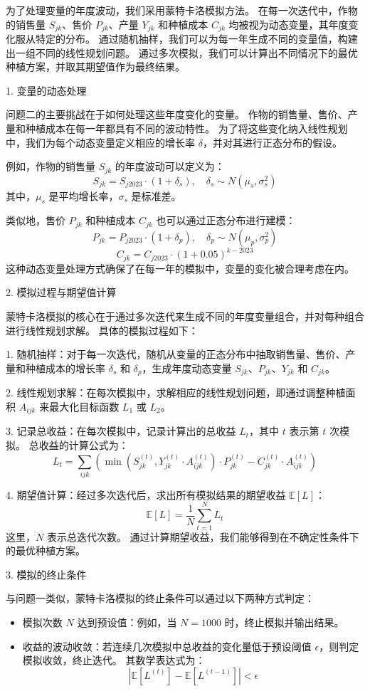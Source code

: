 \documentclass[12pt,a4paper]{nmmcm}
\begin{document}
为了处理变量的年度波动，我们采用蒙特卡洛模拟方法。
在每一次迭代中，作物的销售量 $S_{jk}$、售价 $P_{jk}$、产量 $Y_{jk}$ 和种植成本 $C_{jk}$ 均被视为动态变量，其年度变化服从特定的分布。
通过随机抽样，我们可以为每一年生成不同的变量值，构建出一组不同的线性规划问题。
通过多次模拟，我们可以计算出不同情况下的最优种植方案，并取其期望值作为最终结果。


1. 变量的动态处理

问题二的主要挑战在于如何处理这些年度变化的变量。
作物的销售量、售价、产量和种植成本在每一年都具有不同的波动特性。
为了将这些变化纳入线性规划中，我们为每个动态变量定义相应的增长率 $\delta$，并对其进行正态分布的假设。


例如，作物的销售量 $S_{jk}$ 的年度波动可以定义为：
\[
  S_{jk} = S_{j2023} \cdot (1 + \delta_s), \quad \delta_s \sim N(\mu_s, \sigma_s^2)
\]
其中，$\mu_s$ 是平均增长率，$\sigma_s$ 是标准差。


类似地，售价 $P_{jk}$ 和种植成本 $C_{jk}$ 也可以通过正态分布进行建模：
\[
  P_{jk} = P_{j2023} \cdot (1 + \delta_p), \quad \delta_p \sim N(\mu_p, \sigma_p^2)
\]
\[
  C_{jk} = C_{j2023} \cdot (1 + 0.05)^{k-2023}
\]
这种动态变量处理方式确保了在每一年的模拟中，变量的变化被合理考虑在内。


2. 模拟过程与期望值计算

蒙特卡洛模拟的核心在于通过多次迭代来生成不同的年度变量组合，并对每种组合进行线性规划求解。
具体的模拟过程如下：

1. 随机抽样：对于每一次迭代，随机从变量的正态分布中抽取销售量、售价、产量和种植成本的增长率 $\delta_s$ 和 $\delta_p$，生成年度动态变量 $S_{jk}$、$P_{jk}$、$Y_{jk}$ 和 $C_{jk}$。


2. 线性规划求解：在每次模拟中，求解相应的线性规划问题，即通过调整种植面积 $A_{ijk}$ 来最大化目标函数 $L_1$ 或 $L_2$。


3. 记录总收益：在每次模拟中，记录计算出的总收益 $L_t$，其中 $t$ 表示第 $t$ 次模拟。
总收益的计算公式为：
\[
  L_t = \sum_{ijk} \left( \min(S_{jk}^{(t)}, Y_{jk}^{(t)} \cdot A_{ijk}^{(t)}) \cdot P_{jk}^{(t)} - C_{jk}^{(t)} \cdot A_{ijk}^{(t)} \right)
\]

4. 期望值计算：经过多次迭代后，求出所有模拟结果的期望收益 $\mathbb{E}[L]$：
\[
  \mathbb{E}[L] = \frac{1}{N} \sum_{t=1}^{N} L_t
\]
这里，$N$ 表示总迭代次数。
通过计算期望收益，我们能够得到在不确定性条件下的最优种植方案。


3. 模拟的终止条件

与问题一类似，蒙特卡洛模拟的终止条件可以通过以下两种方式判定：
\begin{itemize}
  \item 模拟次数 $N$ 达到预设值：例如，当 $N=1000$ 时，终止模拟并输出结果。

  \item 收益的波动收敛：若连续几次模拟中总收益的变化量低于预设阈值 $\epsilon$，则判定模拟收敛，终止迭代。
        其数学表达式为：
        \[
          |\mathbb{E}[L^{(t)}] - \mathbb{E}[L^{(t-1)}]| < \epsilon
        \]
\end{itemize}
\end{document}
